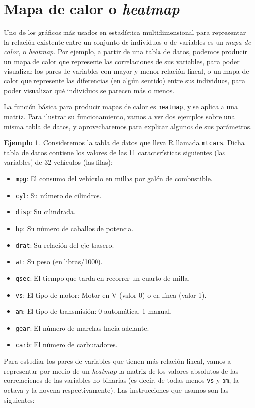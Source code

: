 \documentclass[
]{book}
\providecommand{\tightlist}{%
  \setlength{\itemsep}{0pt}\setlength{\parskip}{0pt}}
\theoremstyle{definition}
\theoremstyle{definition}
\newtheorem{example}{Ejemplo}[chapter]
\theoremstyle{definition}
\theoremstyle{remark}
\begin{document}
\hypertarget{mapa-de-calor-o-heatmap}{%
\section{\texorpdfstring{Mapa de calor o \emph{heatmap}}{Mapa de calor o heatmap}}\label{mapa-de-calor-o-heatmap}}

Uno de los gráficos más usados en estadística multidimensional para representar la relación existente entre un conjunto de individuos o de variables es un \emph{mapa de calor}, o \emph{heatmap}. Por ejemplo, a partir de una tabla de datos, podemos producir un mapa de calor que represente las correlaciones de sus variables, para poder visualizar los pares de variables con mayor y menor relación lineal, o un mapa de calor que represente las diferencias (en algún sentido) entre sus individuos, para poder visualizar qué individuos se parecen más o menos.

La función básica para producir mapas de calor es \texttt{heatmap}, y se aplica a una matriz.
Para ilustrar su funcionamiento, vamos a ver dos ejemplos sobre una misma tabla de datos, y aprovecharemos para explicar algunos de sus parámetros.

\begin{example}
\protect\hypertarget{exm:mtcars}{}{\label{exm:mtcars} }Consideremos la tabla de datos que lleva R llamada \texttt{mtcars}. Dicha tabla de datos contiene los valores de las 11 características siguientes (las variables) de 32 vehículos (las filas):

\begin{itemize}
\tightlist
\item
  \texttt{mpg}: El consumo del vehículo en millas por galón de combustible.
\item
  \texttt{cyl}: Su número de cilindros.
\item
  \texttt{disp}: Su cilindrada.
\item
  \texttt{hp}: Su número de caballos de potencia.
\item
  \texttt{drat}: Su relación del eje trasero.
\item
  \texttt{wt}: Su peso (en libras/1000).
\item
  \texttt{qsec}: El tiempo que tarda en recorrer un cuarto de milla.
\item
  \texttt{vs}: El tipo de motor: Motor en V (valor 0) o en línea (valor 1).
\item
  \texttt{am}: El tipo de transmisión: 0 automática, 1 manual.
\item
  \texttt{gear}: El número de marchas hacia adelante.
\item
  \texttt{carb}: El número de carburadores.
\end{itemize}

Para estudiar los pares de variables que tienen más relación lineal, vamos a representar por medio de un \emph{heatmap} la matriz de los valores absolutos de las correlaciones de las variables no binarias
(es decir, de todas menos \texttt{vs} y \texttt{am}, la octava y la novena respectivamente). Las instrucciones que usamos son las siguientes:
\end{example}
\end{document}

